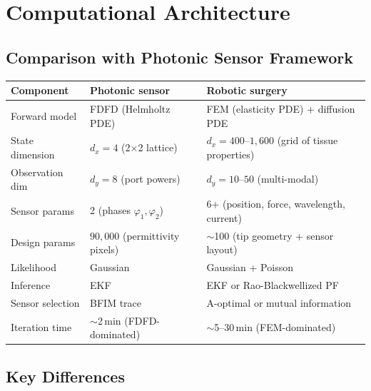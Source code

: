 \documentclass[11pt,a4paper]{article}
\theoremstyle{definition}
\begin{document}
\section{Computational Architecture}

\subsection{Comparison with Photonic Sensor Framework}

\begin{center}
\renewcommand{\arraystretch}{1.3}
\begin{tabular}{@{}p{3.5cm}p{5cm}p{5cm}@{}}
\toprule
\textbf{Component} & \textbf{Photonic sensor} & \textbf{Robotic surgery} \\
\midrule
Forward model & FDFD (Helmholtz PDE) & FEM (elasticity PDE) + diffusion PDE \\
State dimension & $d_x = 4$ (2$\times$2 lattice) & $d_x = 400$--$1{,}600$ (grid of tissue properties) \\
Observation dim & $d_y = 8$ (port powers) & $d_y = 10$--$50$ (multi-modal) \\
Sensor params & 2 (phases $\varphi_1, \varphi_2$) & 6+ (position, force, wavelength, current) \\
Design params & $90{,}000$ (permittivity pixels) & $\sim$100 (tip geometry + sensor layout) \\
Likelihood & Gaussian & Gaussian + Poisson \\
Inference & EKF & EKF or Rao-Blackwellized PF \\
Sensor selection & BFIM trace & A-optimal or mutual information \\
Iteration time & $\sim$2\,min (FDFD-dominated) & $\sim$5--30\,min (FEM-dominated) \\
\bottomrule
\end{tabular}
\end{center}

\subsection{Key Differences}
\end{document}
